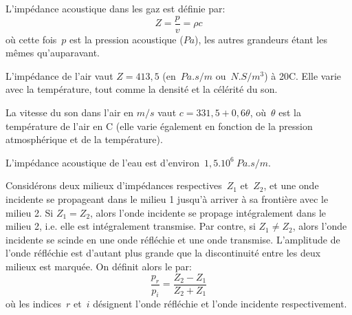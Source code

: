 \medskip
L'impédance acoustique dans les gaz est définie par:
\begin{equation}
Z = \dfrac{p}{v}=\rho c
\end{equation}
où cette fois~$p$ est la pression acoustique ($Pa$), les autres grandeurs étant les mêmes qu'auparavant.

\begin{remarque}
L'impédance de l'air vaut $Z=413,5$ (en~$Pa.s/m$ ou~$N.S/m^3$) à 20\degre C. Elle varie avec la température, tout comme la densité et la célérité du son.

La vitesse du son dans l'air en $m/s$ vaut $c=331,5+0,6\theta$, où~$\theta$ est la température de l'air en \degre C (elle varie également en fonction de la pression atmosphérique et de la température).

L'impédance acoustique de l'eau est d'environ~$1,5.10^6 ~Pa.s/m$.
\end{remarque}

Considérons deux milieux d'impédances respectives~$Z_1$ et~$Z_2$, et une onde incidente se propageant dans le milieu 1 jusqu'à arriver à sa frontière avec le milieu 2.
Si $Z_1=Z_2$, alors l'onde incidente se propage intégralement dans le milieu 2, i.e. elle est intégralement transmise.
Par contre, si $Z_1\ne Z_2$, alors l'onde incidente se scinde en une onde réfléchie et une onde transmise. L'amplitude de l'onde réfléchie est d'autant plus grande que la discontinuité entre les deux milieux est marquée.
On définit alors le  par:
\begin{equation}
\dfrac{p_r}{p_i}=\dfrac{Z_2-Z_1}{Z_2+Z_1}
\end{equation}
où les indices~$r$ et~$i$ désignent l'onde réfléchie et l'onde incidente respectivement.

